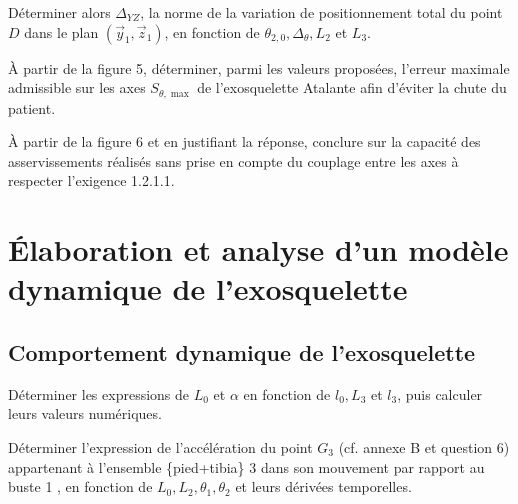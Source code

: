 \documentclass[11pt]{article}
\begin{document}
\UPSTIquestion Déterminer alors $\Delta_{Y Z}$, la norme de la variation de positionnement total du point $D$ dans le plan $\left(\vec{y}_{1}, \vec{z}_{1}\right)$, en fonction de $\theta_{2,0}, \Delta_{\theta}, L_{2}$ et $L_{3}$.
\begin{UPSTIcorrige}

\end{UPSTIcorrige}

\UPSTIquestion À partir de la figure 5, déterminer, parmi les valeurs proposées, l'erreur maximale admissible sur les axes $S_{\theta, \max }$ de l'exosquelette Atalante afin d'éviter la chute du patient.
\begin{UPSTIcorrige}

\end{UPSTIcorrige}

\UPSTIquestion À partir de la figure 6 et en justifiant la réponse, conclure sur la capacité des asservissements réalisés sans prise en compte du couplage entre les axes à respecter l'exigence 1.2.1.1.


\section{Élaboration et analyse d'un modèle dynamique de l'exosquelette}


\subsection{Comportement dynamique de l'exosquelette}

\UPSTIquestion Déterminer les expressions de $L_{0}$ et $\alpha$ en fonction de $l_{0}, L_{3}$ et $l_{3}$, puis calculer leurs valeurs numériques.
\begin{UPSTIcorrige}

\end{UPSTIcorrige}

\UPSTIquestion Déterminer l'expression de l'accélération du point $G_{3}$ (cf. annexe B et question 6) appartenant à l'ensemble \{pied+tibia\} 3 dans son mouvement par rapport au buste 1 , en fonction de $L_{0}, L_{2}, \theta_{1}, \theta_{2}$ et leurs dérivées temporelles.
\begin{UPSTIcorrige}

\end{UPSTIcorrige}
\end{document}
